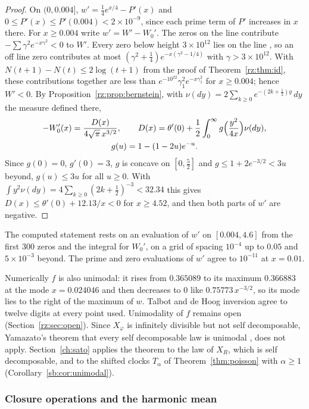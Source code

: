 \begin{proof}
On $(0,0.004]$, $w'=\frac14e^{x/4}-P'(x)$ and $0\le P'(x)\le P'(0.004)<2\times10^{-9}$, since each prime term of $P'$ increases in $x$ there. For $x\ge0.004$ write $w'=W'-W_0'$. The zeros on the line contribute $-\sum\gamma^2e^{-x\gamma^2}<0$ to $W'$. Every zero below height $3\times10^{12}$ lies on the line \cite{PT21}, so an off line zero contributes at most $(\gamma^2+\frac14)e^{-x(\gamma^2-1/4)}$ with $\gamma>3\times10^{12}$. With $N(t+1)-N(t)\le2\log(t+1)$ from the proof of Theorem~\ref{rz:thm:id}, these contributions together are less than $e^{-10^{22}}\gamma_1^2e^{-x\gamma_1^2}$ for $x\ge0.004$; hence $W'<0$. By Proposition~\ref{rz:prop:bernstein}, with $\nu(dy)=2\sum_{k\ge0}e^{-(2k+\frac12)y}\,dy$ the measure defined there,
\begin{gather*}
-W_0'(x)=\frac{D(x)}{4\sqrt\pi\,x^{3/2}},\qquad D(x)=\theta'(0)+\frac12\int_0^\infty g\Bigl(\frac{y^2}{4x}\Bigr)\nu(dy),\\
g(u)=1-(1-2u)e^{-u}.
\end{gather*}
Since $g(0)=0$, $g'(0)=3$, $g$ is concave on $[0,\frac52]$ and $g\le1+2e^{-3/2}<3u$ beyond, $g(u)\le3u$ for all $u\ge0$. With $\int y^2\nu(dy)=4\sum_{k\ge0}(2k+\frac12)^{-3}<32.34$ this gives $D(x)\le\theta'(0)+12.13/x<0$ for $x\ge4.52$, and then both parts of $w'$ are negative.
\end{proof}

The computed statement rests on an evaluation of $w'$ on $[0.004,4.6]$ from the first 300 zeros and the integral for $W_0'$, on a grid of spacing $10^{-4}$ up to $0.05$ and $5\times10^{-3}$ beyond. The prime and zero evaluations of $w'$ agree to $10^{-11}$ at $x=0.01$.

Numerically $f$ is also unimodal: it rises from $0.365089$ to its maximum $0.366883$ at the mode $x=0.024046$ and then decreases to $0$ like $0.75773\,x^{-3/2}$, so its mode lies to the right of the maximum of $w$. Talbot and de Hoog inversion agree to twelve digits at every point used. Unimodality of $f$ remains open (Section~\ref{rz:sec:open}). Since $X_\varphi$ is infinitely divisible but not self decomposable, Yamazato's theorem that every self decomposable law is unimodal \cite{Yamazato78}, \cite[Theorem~53.1]{Sato99} does not apply. Section~\ref{ch:sato} applies the theorem to the law of $X_R$, which is self decomposable, and to the shifted clocks $T_\alpha$ of Theorem~\ref{thm:poisson} with $\alpha\ge1$ (Corollary~\ref{sb:cor:unimodal}).

\subsubsection{Closure operations and the harmonic mean}

